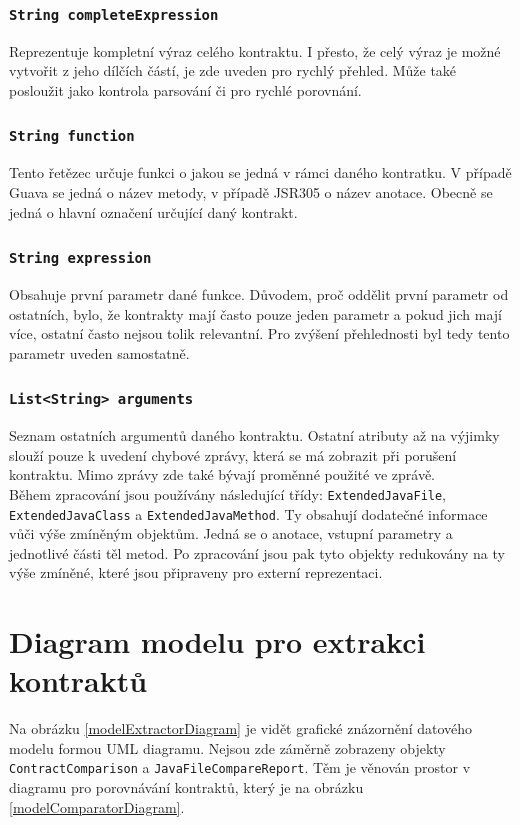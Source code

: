 				\subsubsection{\texttt{String completeExpression}} 
					Reprezentuje kompletní výraz celého kontraktu. I přesto, že celý výraz je možné vytvořit z jeho dílčích částí, je zde uveden pro rychlý přehled. Může také posloužit jako kontrola parsování či pro rychlé porovnání.
			
				\subsubsection{\texttt{String function}} 
					Tento řetězec určuje funkci o jakou se jedná v rámci daného kontratku. V případě Guava se jedná o název metody, v případě JSR305 o název anotace. Obecně se jedná o hlavní označení určující daný kontrakt.
			
				\subsubsection{\texttt{String expression}} 
					Obsahuje první parametr dané funkce. Důvodem, proč oddělit první parametr od ostatních, bylo, že kontrakty mají často pouze jeden parametr a pokud jich mají více, ostatní často nejsou tolik relevantní. Pro zvýšení přehlednosti byl tedy tento parametr uveden samostatně.
			
				\subsubsection{\texttt{List<String> arguments}} 
					Seznam ostatních argumentů daného kontraktu. Ostatní atributy až na výjimky slouží pouze k uvedení chybové zprávy, která se má zobrazit při porušení kontraktu. Mimo zprávy zde také bývají proměnné použité ve zprávě.\\					
	
		Během zpracování jsou používány následující třídy: \texttt{ExtendedJavaFile}, \texttt{ExtendedJavaClass} a \texttt{ExtendedJavaMethod}. Ty obsahují dodatečné informace vůči výše zmíněným objektům. Jedná se o anotace, vstupní parametry a jednotlivé části těl metod.	Po zpracování jsou pak tyto objekty redukovány na ty výše zmíněné, které jsou připraveny pro externí reprezentaci.
		
		
		\section{Diagram modelu pro extrakci kontraktů}
			Na obrázku \ref{modelExtractorDiagram} je vidět grafické znázornění datového modelu formou UML diagramu. Nejsou zde záměrně zobrazeny objekty \texttt{ContractComparison} a \texttt{JavaFileCompareReport}. Těm je věnován prostor v diagramu pro porovnávání kontraktů, který je na obrázku \ref{modelComparatorDiagram}.		
		
